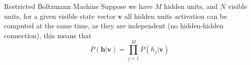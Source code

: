 \begin{frame}{Restricted Boltzmann Machine}
    \justifying%
    Suppose we have $M$ hidden units, and $N$ visible units, for a given visible state vector $\mathbf{v}$ all hidden units activation can be computed at the same time, as they are independent (no hidden-hidden connection), this means that
    \begin{equation}
        \label{eq:prob-hidden-unit-rbm}
        P(\mathbf{h} | \mathbf{v}) = \prod^{M}_{j = 1} P(h_{j} | \mathbf{v})
    \end{equation}
\end{frame}
%
